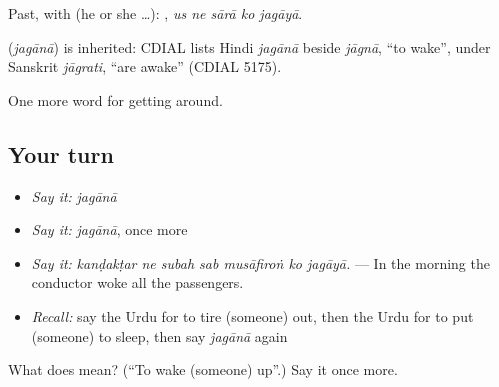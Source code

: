 Past, with  (he or she …):     , \emph{us ne sārā ko jagāyā}.

\begin{cousinweb}
\textbf{} (\emph{jagānā}) is inherited: CDIAL lists Hindi \emph{jagānā} beside \emph{jāgnā}, \textquotedblleft{}to wake\textquotedblright{}, under Sanskrit \emph{jāgrati}, \textquotedblleft{}are awake\textquotedblright{} (CDIAL 5175).
\end{cousinweb}

\begin{grammarlens}[title={What you've built}]
One more word for getting around.
\end{grammarlens}

\subsection*{Your turn}
\begin{itemize}
\raggedright
  \item \emph{Say it:} \emph{jagānā}
  \item \emph{Say it:} \emph{jagānā}, once more
  \item \emph{Say it:} \emph{kanḍakṭar ne subah sab musāfiroṅ ko jagāyā.} — In the morning the conductor woke all the passengers.
  \item \emph{Recall:} say the Urdu for to tire (someone) out, then the Urdu for to put (someone) to sleep, then say \emph{jagānā} again
\end{itemize}

\begin{tcolorbox}[breakable,colback=teal!4,colframe=teal!35!black,title={Before you move on}]
What does  mean? (\textquotedblleft{}To wake (someone) up\textquotedblright{}.) Say it once more.
\end{tcolorbox}
